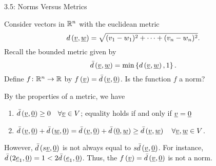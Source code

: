 \documentclass[10pt,letterpaper,english]{beamer}
\begin{document}
\begin{frame}{3.5: Norms Versus Metrics}

\begin{example}
Consider vectors in $\mathbb{R}^n$ with the euclidean metric
\begin{equation*}
d \left( \underline{v}, \underline{w} \right)
= \sqrt{ (v_1 - w_1)^2 + \cdots + (v_n - w_n)^2 }.
\end{equation*}
Recall the bounded metric given by
\begin{equation*}
\bar{d} \left( \underline{v}, \underline{w} \right)
= \min \left\{ d \left( \underline{v}, \underline{w} \right), 1 \right\}.
\end{equation*}
\vspace{3mm}
Define $f \colon \mathbb{R}^n \rightarrow \mathbb{R}$ by
$f \left( \underline{v} \right) = \bar{d} \left( \underline{v}, \underline{0} \right)$.
Is the function $f$ a norm?

By the properties of a metric, we have
\begin{enumerate}
\item $\bar{d} \left( \underline{v}, \underline{0} \right) \geq 0 \quad \forall \underline{v} \in V$; equality holds if and only if $\underline{v} = \underline{0}$
\item $\bar{d} \left( \underline{v}, \underline{0} \right) + \bar{d} \left( \underline{w}, \underline{0} \right) = \bar{d} \left( \underline{v}, \underline{0} \right) + \bar{d} \left( \underline{0}, \underline{w} \right) \geq \bar{d} \left( \underline{v}, \underline{w} \right) \quad \forall \underline{v}, \underline{w} \in V$.
\end{enumerate}

\vspace{2mm}

However, $\bar{d} \left( s \underline{v}, \underline{0} \right)$ is not always equal to $s \bar{d} \left( \underline{v}, \underline{0} \right)$.
For instance,
$\bar{d} \left( 2 \underline{e}_1, \underline{0} \right) = 1 < 2 \bar{d} \left( \underline{e}_1, \underline{0} \right)$.
Thus, the $f \left( \underline{v} \right) = \bar{d} \left( \underline{v}, \underline{0} \right)$
is not a norm.
\end{example}

\end{frame}
\end{document}
